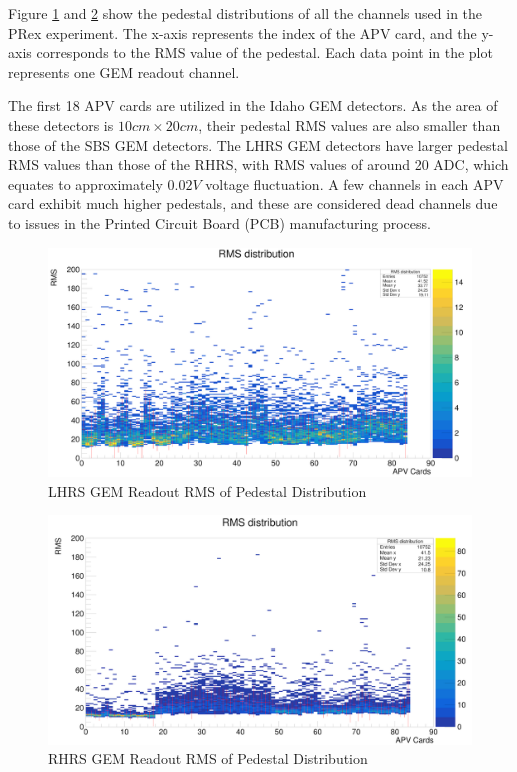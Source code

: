 Figure \ref{fig:lhrs_pedestal_distribution} and \ref{fig:rhrs_pedestal_distribution} show the pedestal distributions of all the channels used in the PRex experiment. The x-axis represents the index of the APV card, and the y-axis corresponds to the RMS value of the pedestal. Each data point in the plot represents one GEM readout channel.

The first 18 APV cards are utilized in the Idaho GEM detectors. As the area of these detectors is $10 cm \times 20 cm$, their pedestal RMS values are also smaller than those of the SBS GEM detectors. The LHRS GEM detectors have larger pedestal RMS values than those of the RHRS, with RMS values of around 20 ADC, which equates to approximately $0.02 V$ voltage fluctuation. A few channels in each APV card exhibit much higher pedestals, and these are considered dead channels due to issues in the Printed Circuit Board (PCB) manufacturing process.

\begin{figure}[!htbp]
    \centering
    \includegraphics[width=\textwidth]{images/chap5/LHRS_pedestal.png}
    \caption{LHRS GEM Readout RMS of Pedestal Distribution}
    \label{fig:lhrs_pedestal_distribution}
\end{figure}

\begin{figure}[!htbp]
    \centering
    \includegraphics[width=\textwidth]{images/chap5/rhrs_pedestal.png}
    \caption{RHRS GEM Readout RMS of Pedestal Distribution}
    \label{fig:rhrs_pedestal_distribution}
\end{figure}


